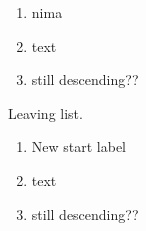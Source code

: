 \documentclass{article}
\newcommand\reverselabel[1]{%
  \def\theenumi{}%
  \renewcommand\makelabel{\makebox[\dimexpr\labelwidth-3pt\relax][r]{%
    \the\numexpr#1-\value{enumi}+1\relax}}}%
\begin{document}
\begin{enumerate}
\reverselabel{10}%
\item nima
\item text
\item still descending??
\end{enumerate}
Leaving list.
\begin{enumerate}
\reverselabel{3}%
\item New start label 
\item text
\item still descending??
\end{enumerate}
\end{document}
